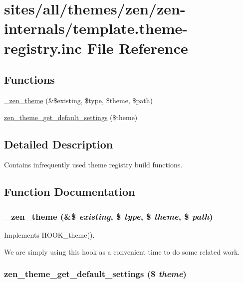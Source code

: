 \hypertarget{template_8theme-registry_8inc}{
\section{sites/all/themes/zen/zen-internals/template.theme-registry.inc File Reference}
\label{template_8theme-registry_8inc}
}
\subsection*{Functions}
\begin{CompactItemize}
\item 
\hyperlink{template_8theme-registry_8inc_b19656d925bc394b2259578521f702b9}{\_\-zen\_\-theme} (\&\$existing, \$type, \$theme, \$path)
\item 
\hyperlink{template_8theme-registry_8inc_d003444bf8f6803e9630aafd8d47ac2b}{zen\_\-theme\_\-get\_\-default\_\-settings} (\$theme)
\end{CompactItemize}


\subsection{Detailed Description}
Contains infrequently used theme registry build functions. 

\subsection{Function Documentation}
\hypertarget{template_8theme-registry_8inc_b19656d925bc394b2259578521f702b9}{
\subsubsection[{\_\-zen\_\-theme}]{\setlength{\rightskip}{0pt plus 5cm}\_\-zen\_\-theme (\&\$ {\em existing}, \/  \$ {\em type}, \/  \$ {\em theme}, \/  \$ {\em path})}}
\label{template_8theme-registry_8inc_b19656d925bc394b2259578521f702b9}


Implements HOOK\_\-theme().

We are simply using this hook as a convenient time to do some related work. \hypertarget{template_8theme-registry_8inc_d003444bf8f6803e9630aafd8d47ac2b}{
\subsubsection[{zen\_\-theme\_\-get\_\-default\_\-settings}]{\setlength{\rightskip}{0pt plus 5cm}zen\_\-theme\_\-get\_\-default\_\-settings (\$ {\em theme})}}
\label{template_8theme-registry_8inc_d003444bf8f6803e9630aafd8d47ac2b}


